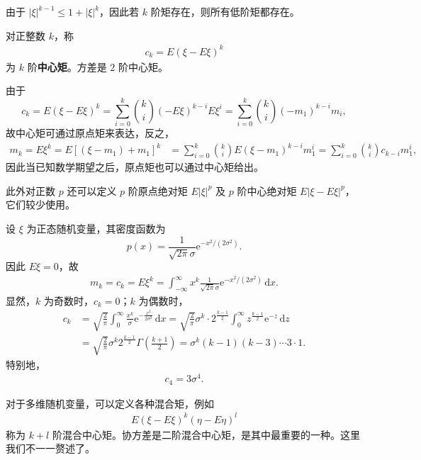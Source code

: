\documentclass[../../main.tex]{subfiles}
\begin{document}
由于 $|\xi|^{k-1}\leqslant 1+|\xi|^k$，因此若 $k$ 阶矩存在，则所有低阶矩都存在。

\begin{definition}[中心矩]\label{definition:ch04-中心矩}
对正整数 $k$，称
\begin{align}
c_k=E(\xi-E\xi)^k\label{align:ch04-中心矩}
\end{align}
为 $k$ 阶\textbf{中心矩}。方差是 $2$ 阶中心矩。
\end{definition}

由于
\[
c_k=E(\xi-E\xi)^k=\sum_{i=0}^k\binom{k}{i}(-E\xi)^{k-i}E\xi^i
=\sum_{i=0}^k\binom{k}{i}(-m_1)^{k-i}m_i,
\]
故中心矩可通过原点矩来表达，反之，
\begin{align*}
m_k=E\xi^k=E[(\xi-m_1)+m_1]^k
&=\sum_{i=0}^k\binom{k}{i}E(\xi-m_1)^{k-i}m_1^i
=\sum_{i=0}^k\binom{k}{i}c_{k-i}m_1^i,
\end{align*}
因此当已知数学期望之后，原点矩也可以通过中心矩给出。

此外对正数 $p$ 还可以定义 $p$ 阶原点绝对矩 $E|\xi|^p$ 及 $p$ 阶中心绝对矩 $E|\xi-E\xi|^p$，它们较少使用。

\begin{example}[正态分布的矩]\label{example:ch04-正态矩}
设 $\xi$ 为正态随机变量，其密度函数为
\[
p(x)=\frac{1}{\sqrt{2\pi}\sigma}\mathrm{e}^{-x^2/(2\sigma^2)}.
\]
因此 $E\xi=0$，故
\begin{align}
m_k=c_k=E\xi^k=\int_{-\infty}^{\infty}x^k\frac{1}{\sqrt{2\pi}\sigma}\mathrm{e}^{-x^2/(2\sigma^2)}\,\mathrm{d}x.\label{align:ch04-正态矩积分}
\end{align}
显然，$k$ 为奇数时，$c_k=0$；$k$ 为偶数时，
\begin{align*}
c_k&=\sqrt{\frac{2}{\pi}}\int_0^{\infty}\frac{x^k}{\sigma}\mathrm{e}^{-\frac{x^2}{2\sigma^2}}\,\mathrm{d}x
=\sqrt{\frac{2}{\pi}}\sigma^k\cdot 2^{\frac{k-1}{2}}\int_0^{\infty}z^{\frac{k-1}{2}}\mathrm{e}^{-z}\,\mathrm{d}z\\
&=\sqrt{\frac{2}{\pi}}\sigma^k 2^{\frac{k-1}{2}}\Gamma\left(\frac{k+1}{2}\right)
=\sigma^k(k-1)(k-3)\cdots 3\cdot 1.
\end{align*}
特别地，
\begin{align}
c_4=3\sigma^4.\label{align:ch04-正态四阶中心矩}
\end{align}
\end{example}

对于多维随机变量，可以定义各种混合矩，例如
\begin{align}
E(\xi-E\xi)^k(\eta-E\eta)^l\label{align:ch04-混合中心矩}
\end{align}
称为 $k+l$ 阶混合中心矩。协方差是二阶混合中心矩，是其中最重要的一种。这里我们不一一赘述了。
\end{document}
